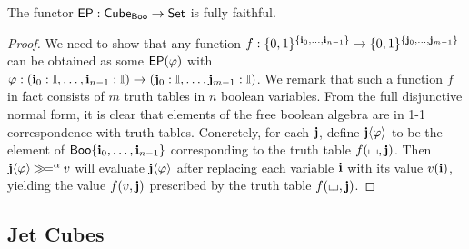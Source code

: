 \documentclass[a4paper]{memoir}
\begin{document}
\begin{proposition}
	The functor $\mathsf{EP} : {\mathsf{Cube}}_{\mathsf{Boo}} \to {\mathsf{Set}}$ is fully faithful.
\end{proposition}
\begin{proof}
	We need to show that any function $f : \mathopen{}\left\{ 0, 1 \right\}\mathclose{}^{\mathopen{}\left\{ \mathbf{i}_0, \ldots, \mathbf{i}_{n-1} \right\}\mathclose{}} \to \mathopen{}\left\{ 0, 1 \right\}\mathclose{}^{\mathopen{}\left\{ \mathbf{j}_0, \ldots, \mathbf{j}_{m-1} \right\}\mathclose{}}$
	can be obtained as some $\mathsf{EP}(\varphi)$ with $\varphi : (\mathbf{i}_0 : {\mathbb I}, \ldots, \mathbf{i}_{n-1} : {\mathbb I}) \to (\mathbf{j}_0 : {\mathbb I}, \ldots, \mathbf{j}_{m-1} : {\mathbb I})$.
	We remark that such a function $f$ in fact consists of $m$ truth tables in $n$ boolean variables.
	From the full disjunctive normal form, it is clear that elements of the free boolean algebra are in 1-1 correspondence with truth tables.
	Concretely, for each $\mathbf{j}$, define $\mathbf{j} \langle \varphi \rangle$ to be the element of $\mathsf{Boo} \mathopen{}\left\{ \mathbf{i}_0, \ldots, \mathbf{i}_{n-1} \right\}\mathclose{}$ corresponding to the truth table $f({\llcorner\hspace{-.4ex}\lrcorner}, \mathbf{j})$.
	Then $\mathbf{j} \langle \varphi \rangle \mathbin{\gg\hspace{-.5ex}=}^\alpha v$ will evaluate $\mathbf{j} \langle \varphi \rangle$ after replacing each variable $\mathbf{i}$ with its value $v(\mathbf{i})$, yielding the value $f(v, \mathbf{j})$ prescribed by the truth table $f({\llcorner\hspace{-.4ex}\lrcorner}, \mathbf{j})$.
\end{proof}

\subsection{Jet Cubes}
\end{document}

